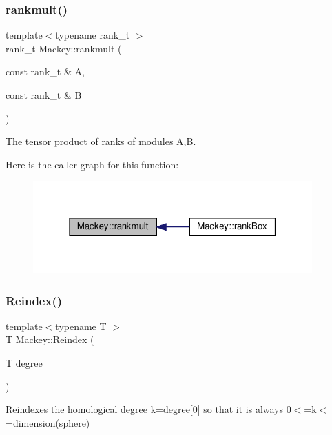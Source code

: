 \subsubsection{\texorpdfstring{rankmult()}{rankmult()}}
{\footnotesize\ttfamily template$<$typename rank\+\_\+t $>$ \\
rank\+\_\+t Mackey\+::rankmult (\begin{DoxyParamCaption}\item[{const rank\+\_\+t \&}]{A,  }\item[{const rank\+\_\+t \&}]{B }\end{DoxyParamCaption})}



The tensor product of ranks of modules A,B. 

Here is the caller graph for this function\+:\nopagebreak
\begin{figure}[H]
\begin{center}
\leavevmode
\includegraphics[width=304pt]{namespaceMackey_aaa0ce7673970bf261628768fb11a1995_icgraph}
\end{center}
\end{figure}
\mbox{\label{namespaceMackey_a7da73ade3ee83c4ffd614e79242d7c04}} 
\subsubsection{\texorpdfstring{Reindex()}{Reindex()}\hspace{0.1cm}{\footnotesize\ttfamily [1/2]}}
{\footnotesize\ttfamily template$<$typename T $>$ \\
T Mackey\+::\+Reindex (\begin{DoxyParamCaption}\item[{T}]{degree }\end{DoxyParamCaption})\hspace{0.3cm}{\ttfamily [inline]}}



Reindexes the homological degree k=degree\mbox{[}0\mbox{]} so that it is always 0$<$=k$<$=dimension(sphere) 

